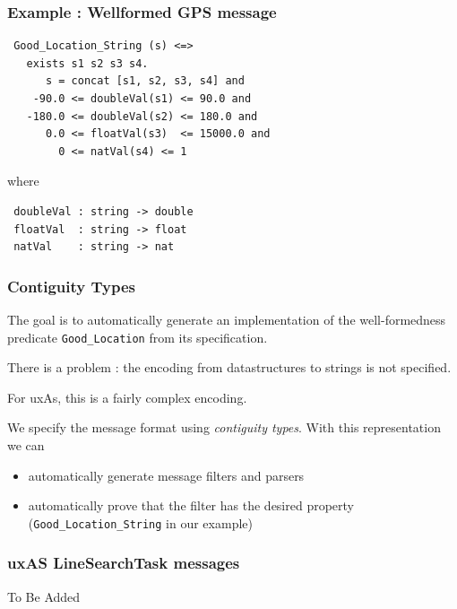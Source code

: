 \documentclass{beamer}
\begin{document}
\begin{frame}[fragile]\frametitle{Example : Wellformed GPS message}

{\small
\begin{verbatim}
 Good_Location_String (s) <=>
   exists s1 s2 s3 s4.
      s = concat [s1, s2, s3, s4] and
    -90.0 <= doubleVal(s1) <= 90.0 and
   -180.0 <= doubleVal(s2) <= 180.0 and
      0.0 <= floatVal(s3)  <= 15000.0 and
        0 <= natVal(s4) <= 1
\end{verbatim}
}

where

{\small
\begin{verbatim}
 doubleVal : string -> double
 floatVal  : string -> float
 natVal    : string -> nat
\end{verbatim}
}

\end{frame}

\begin{frame}[fragile]\frametitle{Contiguity Types}

The goal is to automatically generate an implementation of the
well-formedness predicate \verb+Good_Location+ from its specification.

There is a problem : the encoding from datastructures to strings is not specified.

For uxAs, this is a fairly complex encoding.

We specify the message format using \emph{contiguity types}. With this representation we can
\begin{itemize}
\item automatically generate message filters and parsers
\item automatically prove that the filter has the desired property (\verb+Good_Location_String+ in our example)
\end{itemize}

\end{frame}

\begin{frame}\frametitle{uxAS LineSearchTask messages}

 To Be Added

\end{frame}
\end{document}
